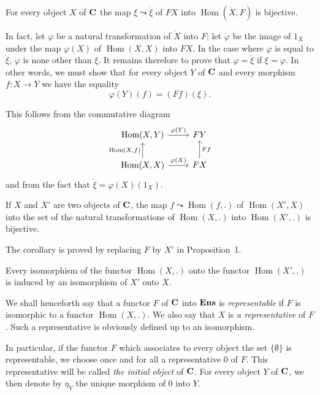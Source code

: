 \begin{proposition}
For every object $X$ of $\mathbf{C}$ the map $\xi\leadsto\dot\xi$ of $FX$ into
$\operatorname{Hom}(\dot X,F)$ is bijective.
\end{proposition}

In fact, let $\varphi$ be a natural transformation of $\dot X$ into $F$; let
$\dot\varphi$ be the image of $1_X$ under the map $\varphi(X)$ of
$\operatorname{Hom}(X,X)$ into $FX$. In the case where
$\varphi$ is equal to $\dot\xi$, $\dot\varphi$ is none other than $\xi$. It
remains therefore to prove that $\varphi = \dot\xi$ if
$\xi = \dot\varphi$. In other words, we must show that for every object $Y$ of
$\mathbf{C}$ and every morphism $f\colon X\to Y$ we have the equality
\[
  \varphi(Y)(f) = (Ff)(\xi).
\]

This follows from the commutative diagram
\[
\begin{tikzcd}
\operatorname{Hom}(X,Y) \arrow[r, "\varphi(Y)"] & FY \\
\operatorname{Hom}(X,X) \arrow[r, "\varphi(X)"]
  \arrow[u, "\operatorname{Hom}(X{,}f)"] & FX \arrow[u, "Ff"']
\end{tikzcd}
\]
and from the fact that $\dot\xi = \varphi(X)(1_X)$.

\begin{corollary}
If $X$ and $X'$ are two objects of $\mathbf{C}$, the map
$f\leadsto\operatorname{Hom}(f,.)$ of $\operatorname{Hom}(X',X)$ into the set
of the natural transformations of $\operatorname{Hom}(X,.)$ into
$\operatorname{Hom}(X',.)$ is bijective.
\end{corollary}

The corollary is proved by replacing $F$ by $\dot X'$ in Proposition~1.

\begin{corollary}
Every isomorphism of the functor $\operatorname{Hom}(X,.)$ onto the functor
$\operatorname{Hom}(X',.)$ is induced by an isomorphism of $X'$ onto $X$.
\end{corollary}

We shall henceforth say that a functor $F$ of $\mathbf{C}$ into $\mathbf{Ens}$ is
\emph{representable} \cite{grothendieck-2} if $F$ is isomorphic to a functor
$\operatorname{Hom}(X,.)$. We also say that $X$ is \emph{a
representative} of $F$. Such a representative is obviously defined up to an
isomorphism.

In particular, if the functor $F$ which associates to every object the set
$\{\emptyset\}$ is representable, we choose once and for all a representative
$0$ of $F$. This representative will be called \emph{the initial object} of
$\mathbf{C}$. For every object $Y$ of $\mathbf{C}$, we then denote by $\eta_Y$ the unique
morphism of $0$ into $Y$.

